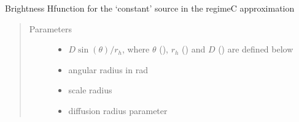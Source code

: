\documentclass[letterpaper,10pt,english]{sphinxmanual}
\begin{document}
\begin{fulllineitems}
\label{\detokenize{diffsph.profiles:diffsph.profiles.analytics.cobrC}}
\sphinxAtStartPar
Brightness H\sphinxhyphen{}function for the ‘constant’ source in the regime\sphinxhyphen{}C approximation
\begin{quote}\begin{description}
\item[{Parameters}] \leavevmode\begin{itemize}
\item {} 
\sphinxAtStartPar
{} \textendash{} \(D\sin(\theta)/r_h\), where \(\theta\) (), \(r_h\) () and \(D\) () are defined below

\item {} 
\sphinxAtStartPar
{} \textendash{} angular radius in rad

\item {} 
\sphinxAtStartPar
{} \textendash{} scale radius

\item {} 
\sphinxAtStartPar
{} \textendash{} diffusion radius parameter

\end{itemize}

\end{description}\end{quote}

\end{fulllineitems}

\end{document}
